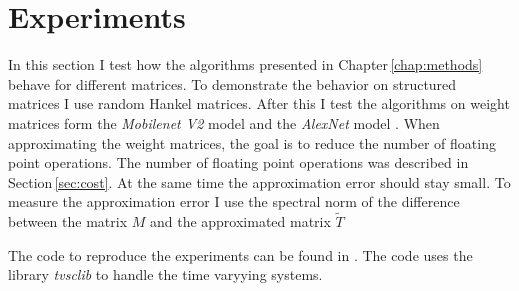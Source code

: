 \documentclass[doctype=mastersthesis,BCOR=15mm,biblatex]{ldvbook}%
\DeclareMathOperator{\length}{len}
\begin{document}


 





\chapter{Experiments}\label{chap:experiments}

In this section I test how the algorithms presented in Chapter\,\ref{chap:methods} behave for different matrices.
To demonstrate the behavior on structured matrices I use random Hankel matrices.
After this I test the algorithms on weight matrices form the \emph{Mobilenet V2} model \cite{sandler_mobilenetv2_2019} and the \emph{AlexNet} model \cite{krizhevsky_one_2014}.
When approximating the weight matrices, the goal is to reduce the number of floating point operations.
The number of floating point operations was described in Section\,\ref{sec:cost}.
At the same time the approximation error should stay small.
To measure the approximation error I use the spectral norm of the difference between the matrix $M$ and the approximated matrix $\tilde{T}$

The code to reproduce the experiments can be found in .
The code uses the library \emph{tvsclib} \cite{kissel_time_2022} to handle the time varyying systems.
  
\end{document}
